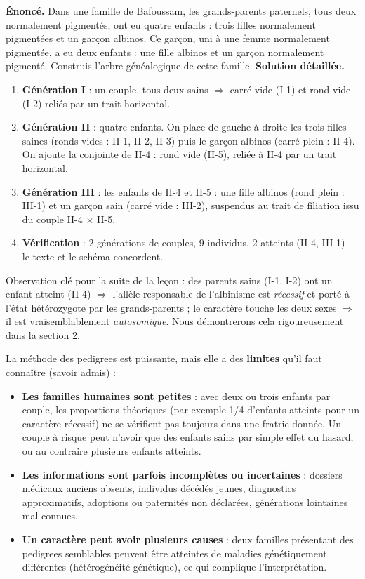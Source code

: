 \documentclass[11pt]{article}
\newcounter{popsec}
\newcounter{popsub}
\newcommand{\courssub}[1]{%
  \stepcounter{popsub}%
  \par\vspace{9pt}\noindent{\popxbold\fontsize{11.5}{13}\selectfont\color{popink}{\color{poporange}\thepopsec.\thepopsub}\hspace{6pt}#1}\par\nopagebreak\vspace{4pt}
}
\begin{document}
\begin{exoresolu}
\textbf{Énoncé.} Dans une famille de Bafoussam, les grands-parents paternels, tous deux normalement pigmentés, ont eu quatre enfants : trois filles normalement pigmentées et un garçon albinos. Ce garçon, uni à une femme normalement pigmentée, a eu deux enfants : une fille albinos et un garçon normalement pigmenté. Construis l'arbre généalogique de cette famille.
\tcblower
\textbf{Solution détaillée.}
\begin{enumerate}
\item \textbf{Génération I} : un couple, tous deux sains $\Rightarrow$ carré vide (I-1) et rond vide (I-2) reliés par un trait horizontal.
\item \textbf{Génération II} : quatre enfants. On place de gauche à droite les trois filles saines (ronds vides : II-1, II-2, II-3) puis le garçon albinos (carré plein : II-4). On ajoute la conjointe de II-4 : rond vide (II-5), reliée à II-4 par un trait horizontal.
\item \textbf{Génération III} : les enfants de II-4 et II-5 : une fille albinos (rond plein : III-1) et un garçon sain (carré vide : III-2), suspendus au trait de filiation issu du couple II-4 $\times$ II-5.
\item \textbf{Vérification} : 2 générations de couples, 9 individus, 2 atteints (II-4, III-1) — le texte et le schéma concordent.
\end{enumerate}
Observation clé pour la suite de la leçon : des parents sains (I-1, I-2) ont un enfant atteint (II-4) $\Rightarrow$ l'allèle responsable de l'albinisme est \emph{récessif} et porté à l'état hétérozygote par les grands-parents ; le caractère touche les deux sexes $\Rightarrow$ il est vraisemblablement \emph{autosomique}. Nous démontrerons cela rigoureusement dans la section 2.
\end{exoresolu}

\courssub{Limites de la méthode généalogique}

La méthode des pedigrees est puissante, mais elle a des \textbf{limites} qu'il faut connaître (savoir admis) :

\begin{itemize}
\item \textbf{Les familles humaines sont petites} : avec deux ou trois enfants par couple, les proportions théoriques (par exemple 1/4 d'enfants atteints pour un caractère récessif) ne se vérifient pas toujours dans une fratrie donnée. Un couple à risque peut n'avoir que des enfants sains par simple effet du hasard, ou au contraire plusieurs enfants atteints.
\item \textbf{Les informations sont parfois incomplètes ou incertaines} : dossiers médicaux anciens absents, individus décédés jeunes, diagnostics approximatifs, adoptions ou paternités non déclarées, générations lointaines mal connues.
\item \textbf{Un caractère peut avoir plusieurs causes} : deux familles présentant des pedigrees semblables peuvent être atteintes de maladies génétiquement différentes (hétérogénéité génétique), ce qui complique l'interprétation.
\end{itemize}
\end{document}
